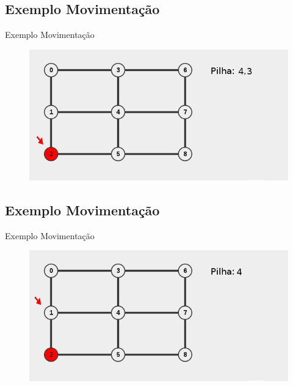 \documentclass{beamer}
\begin{document}
\subsection{Exemplo Movimentação}
\begin{frame}
  Exemplo Movimentação
    \begin{figure}
    \centering
    \includegraphics[width=0.9\linewidth]{software_3}
  \end{figure}
\end{frame}

\subsection{Exemplo Movimentação}
\begin{frame}
  Exemplo Movimentação
    \begin{figure}
    \centering
    \includegraphics[width=0.9\linewidth]{software_4}
  \end{figure}
\end{frame}

\end{document}
